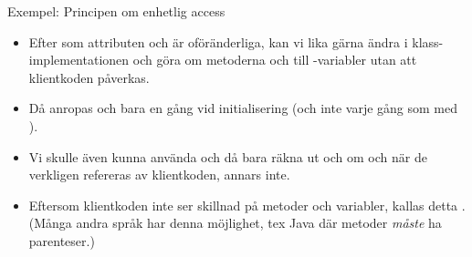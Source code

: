 \begin{Slide}{Exempel: Principen om enhetlig access}\SlideFontSmall
{}
\pause
\begin{itemize}
\item Efter som attributen  och  är oföränderliga, kan vi lika gärna ändra i klass-implementationen och göra om metoderna  och  till -variabler utan att klientkoden påverkas.

\item Då anropas  och  bara en gång vid initialisering (och inte varje gång som med ).

\item Vi skulle även kunna använda  och då bara räkna ut  och  om och när de verkligen refereras av klientkoden, annars inte.

\item Eftersom klientkoden inte ser skillnad på metoder och variabler, kallas detta . (Många andra språk har  denna möjlighet, tex Java där metoder \emph{måste} ha parenteser.)
\end{itemize}
\end{Slide}







